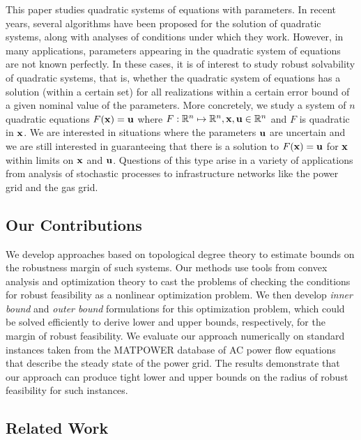 

This paper studies quadratic systems of equations with parameters.
In recent years, several algorithms have been proposed for the solution of quadratic systems, along with analyses of conditions under which they work. 
However, in many applications, parameters appearing in the quadratic system of equations are not known perfectly.
In these cases, it is of interest to study robust solvability of quadratic systems, that is, whether the quadratic system of equations has a solution (within a certain set) for all realizations within a certain error bound of a given nominal value of the parameters.
  More concretely, we study a system of $n$ quadratic equations $F(\bold x)=\bold u$ where $F: \mathbb{R}^n \mapsto \mathbb{R}^n,\bold  x,\bold u \in \mathbb{R}^n$ and $F$ is quadratic in $\bold x$.
  We are interested in situations where the parameters $\bold u$ are uncertain and we are still interested in guaranteeing that there is a solution to $F(\bold x) = \bold u$ for $\bold x$ within limits on $\bold x$ and $\bold u$.
  Questions of this type arise in a variety of applications from analysis of stochastic processes to infrastructure networks like the power grid and the gas grid.

\subsection{Our Contributions}
We develop approaches based on topological degree theory to estimate bounds on the robustness margin of such systems.
  Our methods use tools from convex analysis and optimization theory to cast the problems of checking the conditions for robust feasibility as a nonlinear optimization problem.
  We then develop \emph{inner bound} and \emph{outer bound} formulations for this optimization problem, which could be solved efficiently to derive lower and upper bounds, respectively, for the margin of robust feasibility.
  We evaluate our approach numerically on standard instances taken from the MATPOWER database of AC power flow equations that describe the steady state of the power grid.
  The results demonstrate that our approach can produce tight lower and upper bounds on the radius of robust feasibility for such instances.

\subsection{Related Work}

